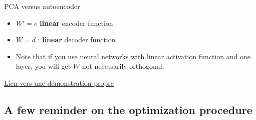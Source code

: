 \documentclass[compress,10pt]{beamer}
\begin{document}

\begin{frame}{PCA versus autoencoder}
\protect\hypertarget{pca-versus-autoencoder-1}{}
\begin{itemize}
\item
  \(W' = e\) \textbf{linear} encoder function
\item
  \(W = d\) : \textbf{linear} decoder function
\item
  Note that if you use neural networks with linear activation function
  and one layer, you will get \(W\) not necessarily orthogonal.
\end{itemize}

\href{http://www.xavierdupre.fr/app/mlstatpy/helpsphinx/c_ml/rn/rn_9_auto.html}{Lien
vers une démonstration propre}
\end{frame}


\subsection{A few reminder on the optimization procedure}
\end{document}
